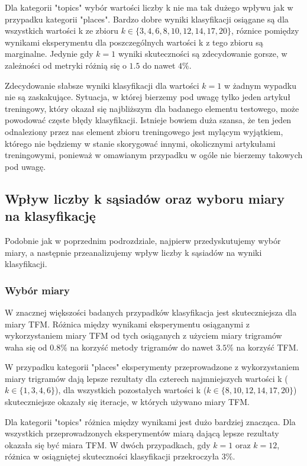 \documentclass{classrep}
\begin{document}
Dla kategorii "topics" wybór wartości liczby k nie ma tak dużego wpływu jak w przypadku kategorii "places". Bardzo dobre wyniki klasyfikacji osiągane są dla wszystkich wartości k ze zbioru $k \in \{3, 4, 6, 8, 10, 12, 14, 17, 20\}$, róznice pomiędzy wynikami eksperymentu dla poszczególnych wartości k z tego zbioru są marginalne. Jedynie gdy $k=1$ wyniki skuteczności są zdecydowanie gorsze, w zależności od metryki różnią się o $1.5$ do nawet $4\%$. \newline

Zdecydowanie słabsze wyniki klasyfikacji dla wartości $k=1$ w żadnym wypadku nie są zaskakujące. Sytuacja, w której bierzemy pod uwagę tylko jeden artykuł treningowy, który okazał się najbliższym dla badanego elementu testowego, może powodować częste błędy klasyfikacji. Istnieje bowiem duża szansa, że ten jeden odnaleziony przez nas element zbioru treningowego jest mylącym wyjątkiem, którego nie będziemy w stanie skorygować innymi, okolicznymi artykułami treningowymi, ponieważ w omawianym przypadku w ogóle nie bierzemy takowych pod uwagę.

\subsection{Wpływ liczby k sąsiadów oraz wyboru miary na klasyfikację}
Podobnie jak w poprzednim podrozdziale, najpierw przedyskutujemy wybór miary, a następnie przeanalizujemy wpływ liczby k sąsiadów na wyniki klasyfikacji.

\subsubsection{Wybór miary}
W znacznej większości badanych przypadków klasyfikacja jest skuteczniejsza dla miary TFM. Różnica między wynikami eksperymentu osiąganymi z wykorzystaniem miary TFM od tych osiąganych z użyciem miary trigramów waha się od $0.8\%$ na korzyść metody trigramów do nawet $3.5\%$ na korzyść TFM. \newline

W przypadku kategorii "places" eksperymenty przeprowadzone z wykorzystaniem miary trigramów dają lepsze rezultaty dla czterech najmniejszych wartości k ($k \in \{1, 3, 4, 6\}$), dla wszystkich pozostałych wartości k ($k \in \{8, 10, 12, 14, 17, 20\}$) skuteczniejsze okazały się iteracje, w których używano miary TFM. \newline

Dla kategorii "topics" różnica między wynikami jest dużo bardziej znacząca. Dla wszystkich przeprowadzonych eksperymentów miarą dającą lepsze rezultaty okazała się być miara TFM. W dwóch przypadkach, gdy $k=1$ oraz $k=12$, różnica w osiągniętej skuteczności klasyfikacji przekroczyła $3\%$.
\end{document}
